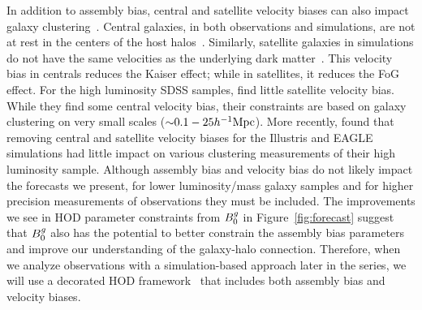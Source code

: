 In addition to assembly bias, central and satellite velocity biases can also
impact galaxy clustering~\citep{guo2015a,guo2015}. Central galaxies, in both
observations and simulations, are not at rest in the centers of the host 
halos~\citep[\eg][]{berlind2003, yoshikawa2003, vandenbosch2005, skibba2011}. 
Similarly, satellite galaxies in simulations do not have the same velocities as
the underlying dark matter~\citep[\eg][]{diemand2004, gao2004, gill2004, lau2010, munari2013,
wu2013}. 
This velocity bias in centrals reduces the Kaiser effect; while in 
satellites, it reduces the FoG effect. For the high luminosity SDSS samples, \cite{guo2015} find little satellite velocity bias.
While they find some central velocity bias, their constraints are based on 
galaxy clustering on very small scales (${\sim}0.1-25h^{-1}{\rm Mpc}$). 
More recently, \cite{beltz-mohramnn2020} found that removing central and
satellite velocity biases for the Illustris and EAGLE simulations had 
little impact on various clustering measurements of their high luminosity
sample. Although assembly bias and velocity bias do not likely impact the
forecasts we present, for lower luminosity/mass galaxy samples and for higher
precision measurements of observations they must be included. The
improvements we see in HOD parameter constraints from $B^g_0$ in
Figure~\ref{fig:forecast} suggest that $B^g_0$ also has the potential to better
constrain the assembly bias parameters and improve our understanding of the 
galaxy-halo connection. Therefore, when we analyze observations with a
simulation-based approach later in the series,
we will use a decorated HOD framework~\citep[such as \eg][]{vakili2019,
zhai2019} that includes both assembly bias and velocity biases. 

